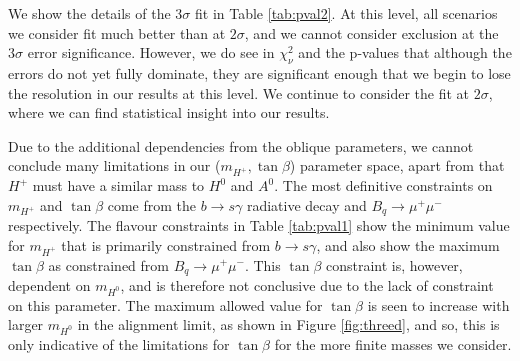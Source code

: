 \documentclass[a4paper,12pt]{article}
\begin{document}
We show the details of the $3\sigma$ fit in Table \ref{tab:pval2}. 
At this level, all scenarios we consider fit much better than at $2\sigma$, and we cannot consider exclusion at the $3\sigma$ error significance. 
However, we do see in $\chi^2_\nu$ and the p-values that although the errors do not yet fully dominate, they are significant enough that we begin to lose the resolution in our results at this level.
We continue to consider the fit at $2\sigma$, where we can find statistical insight into our results.

Due to the additional dependencies from the oblique parameters, we cannot conclude many limitations in our ($m_{H^+},\tan\beta$) parameter space, apart from that $H^+$ must have a similar mass to $H^0$ and $A^0$. 
The most definitive constraints on $m_{H^+}$ and $\tan\beta$ come from the $b\to s\gamma$ radiative decay and $B_q\to\mu^+\mu^-$ respectively. 
The flavour constraints in Table \ref{tab:pval1} show the minimum value for $m_{H^+}$ that is primarily constrained from $b\to s\gamma$, and also show the maximum $\tan\beta$ as constrained from $B_q\to\mu^+\mu^-$. 
This $\tan\beta$ constraint is, however, dependent on $m_{H^0}$, and is therefore not conclusive due to the lack of constraint on this parameter. 
The maximum allowed value for $\tan\beta$ is seen to increase with larger $m_{H^0}$ in the alignment limit, as shown in Figure \ref{fig:threed}, and so, this is only indicative of the limitations for $\tan\beta$ for the more finite masses we consider.
\end{document}

